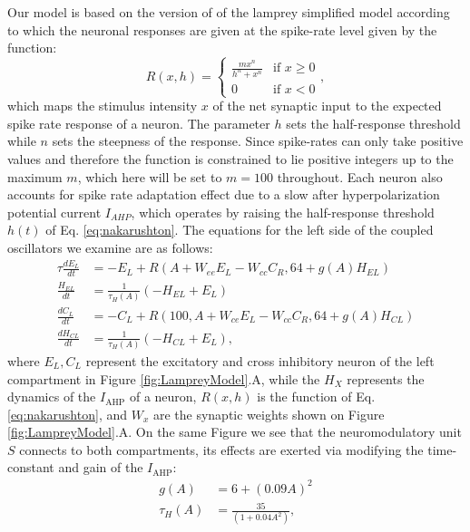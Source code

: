 \documentclass[11pt,a4paper]{article}
\begin{document}
Our model is based on the version of \cite{wilson1999spikes} of the lamprey simplified model \citep{lansner1997realistic}  according to which the neuronal responses are given at the spike-rate level given by the \cite{naka1966s} function:
\begin{equation}
\label{eq:nakarushton}
R(x,h) = \begin{cases} 
\frac{m x^n}{h^n + x^n} &\mbox{if } x \geq 0 \\
0 						&\mbox{if } x < 0
\end{cases},
\end{equation}
which maps the stimulus intensity $x$ of the net synaptic input to the expected spike rate response of a neuron. The parameter $h$ sets the half-response threshold while $n$ sets the steepness of the response. Since spike-rates can only take positive values and therefore the function is constrained to lie positive integers up to the maximum $m$, which here will be set to $m=100$ throughout.%
Each neuron also accounts for spike rate adaptation effect due to a slow after hyperpolarization potential current $I_{AHP}$, which operates by raising the half-response threshold $h(t)$ of Eq. \eqref{eq:nakarushton}. The equations for the left side of the coupled oscillators we examine are as follows:
\begin{align}
\tau \frac{dE_L}{dt} & = - E_L +  R( A + W_{ee} E_L - W_{cc}C_R, 64 + g(A)H_{EL})\\
\frac{H_{EL}}{dt} &= \frac{1}{\tau_H(A)}(-H_{EL}+E_L)\\
\frac{dC_L}{dt} &= -C_L + R(100, A + W_{ce}E_L - W_{cc}C_R, 64+g(A)H_{CL})\\
\frac{dH_{CL}}{dt} &= \frac{1}{\tau_H(A)}(-H_{CL}+E_L),
\end{align}
where $E_L, C_L$ represent the excitatory and cross inhibitory neuron of the left compartment in Figure \ref{fig:LampreyModel}.A, while the $H_{X}$ represents the dynamics of the $I_{\text{AHP}}$ of a neuron, $R(x,h)$ is the \cite{naka1966s} function of Eq. \eqref{eq:nakarushton}, and $W_x$ are the synaptic weights shown on Figure  \ref{fig:LampreyModel}.A. On the same Figure we see that the neuromodulatory unit $S$ connects to both compartments, its effects are exerted via modifying the time-constant and gain of the $I_{\text{AHP}}$:
\begin{align}
g(A) &= 6 + \left( 0.09A \right)^2\\
\tau_H(A) &= \frac{35}{(1 + 0.04 A^2)},
\end{align}
\end{document}
